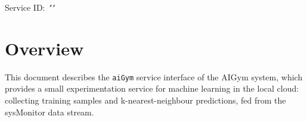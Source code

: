 \documentclass[a4paper]{arrowhead}
\begin{document}
\sloppy

\ArrowheadSetup

\begin{center}
  \vspace*{1cm}
  \huge{\arrowtitle}

  \vspace*{0.2cm}
  \LARGE{\arrowtype}
  \vspace*{1cm}

  \Large{Service ID: \textit{"\arrowid"}}

  \vspace*{\fill}


  \vspace*{1cm}
  \vspace*{\fill}

  \begin{abstract}
    This document describes the HTTP/1.1 protocol with TLS payload security and JSON payload encoding variant of the \texttt{aiGym} service of the AIGym system.
  \end{abstract}

  \vspace*{1cm}
\end{center}

\newpage

\tableofcontents
\newpage

\section{Overview}
\label{sec:overview}

This document describes the \texttt{aiGym} service interface of the AIGym system, which provides a small experimentation service for machine learning in the local cloud: collecting training samples and k-nearest-neighbour predictions, fed from the sysMonitor data stream.
\end{document}
